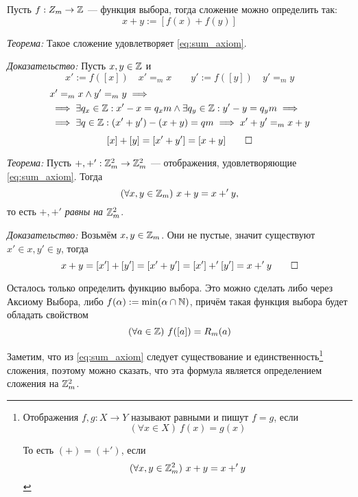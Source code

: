 Пусть $f:Z_{m}\to \mathbb Z$ --- функция выбора, тогда сложение можно 
определить так:
\[
	x+y:=[f(x)+f(y)]
\]

\vspace{1em}
{\it Теорема:}
Такое сложение удовлетворяет \eqref{eq:sum_axiom}.

{\it Доказательство:}
Пусть $x,y\in \mathbb Z$ и 
\[
	x':=f([x])\quad x'=_{m}x\qquad y':=f([y])\quad y'=_{m}y
\]
\[
	\begin{aligned}
		&x'=_{m}x\land y'=_{m}y\implies \\
		&\implies \exists q_{x}\in\mathbb Z:x'-x=q_{x}m\land
	\exists q_{y}\in\mathbb Z:y'-y=q_{y}m\implies\\
		&\implies \exists q\in\mathbb Z:(x'+y')-(x+y)=qm\implies x'+y'=_{m}x+y
	\end{aligned}
\]
\[
	[x]+[y]=[x'+y']=[x+y]\qed
\]

\vspace{1em}
{\it Теорема:} Пусть $+,+':\mathbb Z_{m}^{2}\to\mathbb Z_{m}^{2}$ --- отображения, удовлетворяющие \eqref{eq:sum_axiom}. 
Тогда
\[
	(\forall x,y\in\mathbb Z_{m})~x+y=x+'y,
\]
то есть $+,+'$ {\it равны на} $\mathbb Z_{m}^{2}$.

{\it Доказательство:} Возьмём $x,y\in\mathbb Z_{m}$. Они не пустые, значит 
существуют $x'\in x,y'\in y$, тогда 
\[
	x+y=[x']+[y']=[x'+y']=[x']+'[y']=x+'y\qed
\]

Осталось только определить функцию выбора. Это можно сделать либо через 
Аксиому Выбора, либо $f(\alpha):=\min(\alpha\cap\mathbb N)$, причём такая функция 
выбора будет обладать свойством
\[
	(\forall a\in\mathbb Z)~f([a])=R_{m}(a)
\]

Заметим, что из \eqref{eq:sum_axiom} следует существование и единственность\footnote{
	Отображения $f,g:X\to Y$ называют равными и пишут $f=g$, если 
	\[
		(\forall x\in X)~f(x)=g(x)
	\]

	То есть $(+)=(+')$, если
	\[
		(\forall x,y\in \mathbb Z_{m}^{2})~x+y=x+'y
	\]}
сложения, поэтому можно сказать, что эта формула является определением 
сложения на $\mathbb Z_{m}^{2}$.

